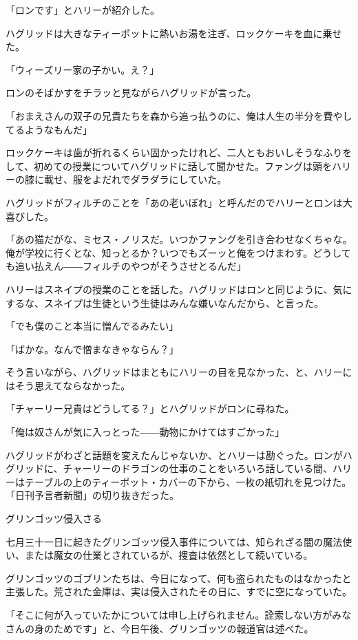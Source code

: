 \documentclass[10pt,a4paper]{article}
\begin{document}
\begin{CJK}{UTF8}{min}
「ロンです」とハリーが紹介した。

ハグリッドは大きなティーポットに熱いお湯を注ぎ、ロックケーキを血に乗せた。

「ウィーズリー家の子かい。え？」

ロンのそばかすをチラッと見ながらハグリッドが言った。

「おまえさんの双子の兄貴たちを森から追っ払うのに、俺は人生の半分を費やしてるようなもんだ」

ロックケーキは歯が折れるくらい固かったけれど、二人ともおいしそうなふりをして、初めての授業についてハグリッドに話して聞かせた。ファングは頭をハリーの膝に載せ、服をよだれでダラダラにしていた。

ハグリッドがフィルチのことを「あの老いぼれ」と呼んだのでハリーとロンは大喜びした。

「あの猫だがな、ミセス・ノリスだ。いつかファングを引き合わせなくちゃな。俺が学校に行くとな、知っとるか？いつでもズーッと俺をつけまわす。どうしても追い払えん――フィルチのやつがそうさせとるんだ」

ハリーはスネイプの授業のことを話した。ハグリッドはロンと同じように、気にするな、スネイプは生徒という生徒はみんな嫌いなんだから、と言った。

「でも僕のこと本当に憎んでるみたい」

「ばかな。なんで憎まなきゃならん？」

そう言いながら、ハグリッドはまともにハリーの目を見なかった、と、ハリーにはそう思えてならなかった。

「チャーリー兄貴はどうしてる？」とハグリッドがロンに尋ねた。

「俺は奴さんが気に入っとった――動物にかけてはすごかった」

ハグリッドがわざと話題を変えたんじゃないか、とハリーは勘ぐった。ロンがハグリッドに、チャーリーのドラゴンの仕事のことをいろいろ話している間、ハリーはテーブルの上のティーポット・カバーの下から、一枚の紙切れを見つけた。「日刊予言者新聞」の切り抜きだった。



グリンゴッツ侵入さる

七月三十一日に起きたグリンゴッツ侵入事件については、知られざる闇の魔法使い、または魔女の仕業とされているが、捜査は依然として続いている。

グリンゴッツのゴブリンたちは、今日になって、何も盗られたものはなかったと主張した。荒された金庫は、実は侵入されたその日に、すでに空になっていた。

「そこに何が入っていたかについては申し上げられません。詮索しない方がみなさんの身のためです」と、今日午後、グリンゴッツの報道官は述べた。




\end{CJK}
\end{document}
